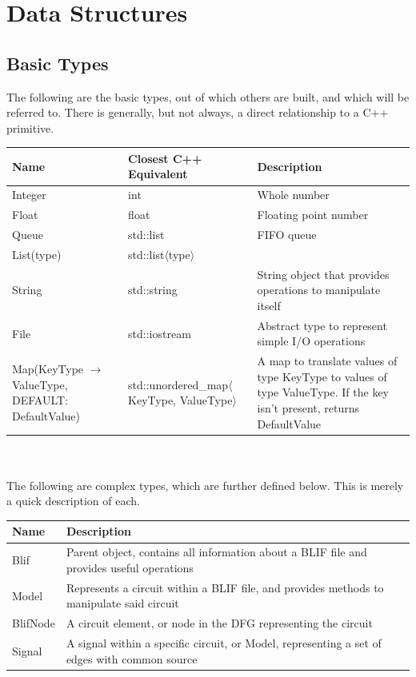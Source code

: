 \documentclass[12pt,final,oneside]{article} %
\begin{document}
\section{Data Structures}\label{secDatastructures}
\subsection{Basic Types}
The following are the basic types, out of which others are built, and which will be referred to. There is generally, but not always, a direct relationship to a C++ primitive.
\\
        \begin{tabularx}{\linewidth}{XXX}
        \toprule
        Name & Closest C++ Equivalent & Description\\
        \midrule
        Integer &  int & Whole number \\
        Float & float & Floating point number \\
        Queue & std::list & FIFO queue \\
        List(type) & std::list$\langle$type$\rangle$ & \\
        String & std::string & String object that provides operations to manipulate itself \\
        File & std::iostream & Abstract type to represent simple I/O operations \\
        Map(KeyType $\to$ ValueType, DEFAULT:  DefaultValue) & std::unordered\_map$\langle$KeyType, ValueType$\rangle$ &  A map to translate values of type KeyType to values of type ValueType. If the key isn't present, returns DefaultValue \\
        \bottomrule
        \end{tabularx}
\\
\\
The following are complex types, which are further defined below. This is merely a quick description of each.
\\
        \begin{tabularx}{\linewidth}{lX}
        \toprule
        Name & Description\\
        \midrule
        Blif & Parent object, contains all information about a \ac{BLIF} file and provides useful operations \\
        Model & Represents a circuit within a \ac{BLIF} file, and provides methods to manipulate said circuit \\
        BlifNode & A circuit element, or node in the \ac{DFG} representing the circuit \\
        Signal & A signal within a specific circuit, or Model, representing a set of edges with common source \\
        \bottomrule
        \end{tabularx}
\end{document}
